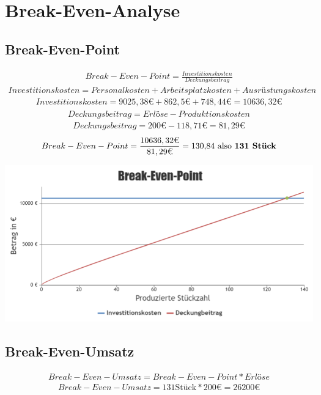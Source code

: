\documentclass[paper=a4, 12pt]{scrreprt}
\begin{document}
	\section{Break-Even-Analyse}\hfill \break
		\subsection{Break-Even-Point}\hfill \break
		\begin{align*} 
		Break-Even-Point = \frac{Investitionskosten}{Deckungsbeitrag}
		\end{align*} 
		\begin{align*} 
		Investitionskosten = Personalkosten + Arbeitsplatzkosten + Ausrüstungskosten
		\end{align*} 
		\begin{align*} 
		Investitionskosten = 9025,38\text{€} + 862,5\text{€} + 748,44\text{€} = 10636,32\text{€}
		\end{align*} 
		\begin{align*} 
		Deckungsbeitrag = Erlöse - Produktionskosten
		\end{align*} 
		\begin{align*}
		Deckungsbeitrag = 200\text{€} - 118,71\text{€} = 81,29\text{€}
		\end{align*} 
		\begin{align*} 
		Break-Even-Point = \frac{10636,32\text{€}}{81,29\text{€}} = \text{130,84 also \textbf{131 Stück}}
		\end{align*} 
		\begin{adjustbox}{center,caption={Brek-Even-Point},label={fig:BEP.PNG},nofloat=figure,vspace=\bigskipamount}
			\includegraphics[width=\textwidth]{img/BEP.PNG}
		\end{adjustbox}
			
		\subsection{Break-Even-Umsatz}\hfill \break
		\begin{align*} 
		Break-Even-Umsatz = Break-Even-Point * Erlöse
		\end{align*} 
		\begin{align*} 
		Break-Even-Umsatz = 131 \text{Stück} * 200\text{€} = 26200\text{€}
		\end{align*} 
\newpage
			
\end{document}
